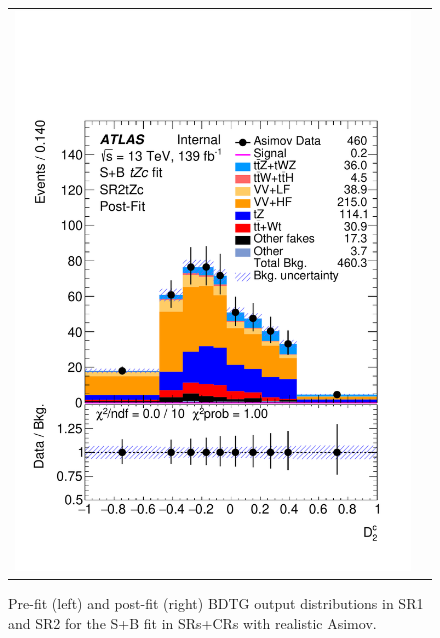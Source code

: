 \begin{figure}[htbp]
\begin{tabular}{cc}
		\includegraphics[width=.45\textwidth]{Appendices/AP8/figures/SPLUSB_CRSR_UsingSMTFullSys/Plots/SR2_postFit} \\
	\end{tabular}
	\caption{Pre-fit (left) and post-fit (right) BDTG output distributions in SR1 and SR2 for the S+B \tZc fit in SRs+CRs with realistic Asimov.
		\ErrStatSys
	}%
	\label{fig:stat_smt:tzc:splusb:crsr:srplots:1}
\end{figure}

